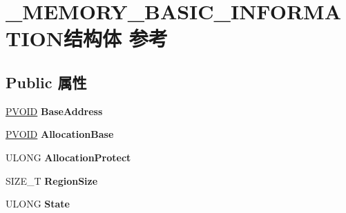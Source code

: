 \hypertarget{struct___m_e_m_o_r_y___b_a_s_i_c___i_n_f_o_r_m_a_t_i_o_n}{}\section{\+\_\+\+M\+E\+M\+O\+R\+Y\+\_\+\+B\+A\+S\+I\+C\+\_\+\+I\+N\+F\+O\+R\+M\+A\+T\+I\+O\+N结构体 参考}
\label{struct___m_e_m_o_r_y___b_a_s_i_c___i_n_f_o_r_m_a_t_i_o_n}
\subsection*{Public 属性}
\begin{DoxyCompactItemize}
\item 
\mbox{\label{struct___m_e_m_o_r_y___b_a_s_i_c___i_n_f_o_r_m_a_t_i_o_n_ac220cffe1f2b29a36927c2b4f0ab2966}} 
\hyperlink{interfacevoid}{P\+V\+O\+ID} {\bfseries Base\+Address}
\item 
\mbox{\label{struct___m_e_m_o_r_y___b_a_s_i_c___i_n_f_o_r_m_a_t_i_o_n_a308f6b3b2e13f0a2c8f044b9ede38faf}} 
\hyperlink{interfacevoid}{P\+V\+O\+ID} {\bfseries Allocation\+Base}
\item 
\mbox{\label{struct___m_e_m_o_r_y___b_a_s_i_c___i_n_f_o_r_m_a_t_i_o_n_a62276c0e07c5efda506bb217b9f0f59b}} 
U\+L\+O\+NG {\bfseries Allocation\+Protect}
\item 
\mbox{\label{struct___m_e_m_o_r_y___b_a_s_i_c___i_n_f_o_r_m_a_t_i_o_n_a229fdf9ed9f2ac58bfed066274a538e3}} 
S\+I\+Z\+E\+\_\+T {\bfseries Region\+Size}
\item 
\mbox{\label{struct___m_e_m_o_r_y___b_a_s_i_c___i_n_f_o_r_m_a_t_i_o_n_a7c6cdca63f02adcd8dc9bc8a485480a5}} 
U\+L\+O\+NG {\bfseries State}
\item 
\mbox{\label{struct___m_e_m_o_r_y___b_a_s_i_c___i_n_f_o_r_m_a_t_i_o_n_af745f83b5bcb09b58c6f89bcc4b1a924}} 

\end{DoxyCompactItemize}
